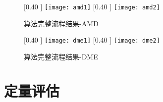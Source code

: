     \begin{figure}[htb]
      \centering
      [0.40 \textwidth] %
        {\texttt{[image: amd1]}} %
      [0.40 \textwidth] %
        {\texttt{[image: amd2]}} \\
      \caption{算法完整流程结果-AMD}
      \label{fig:recon-amd}
    \end{figure}

    \begin{figure}[htb]
      \centering
      [0.40 \textwidth] %
        {\texttt{[image: dme1]}} %
      [0.40 \textwidth] %
        {\texttt{[image: dme2]}} \\
      \caption{算法完整流程结果-DME}
      \label{fig:recon-dme}
    \end{figure}



\section{定量评估}
    \label{sec:analyze}
